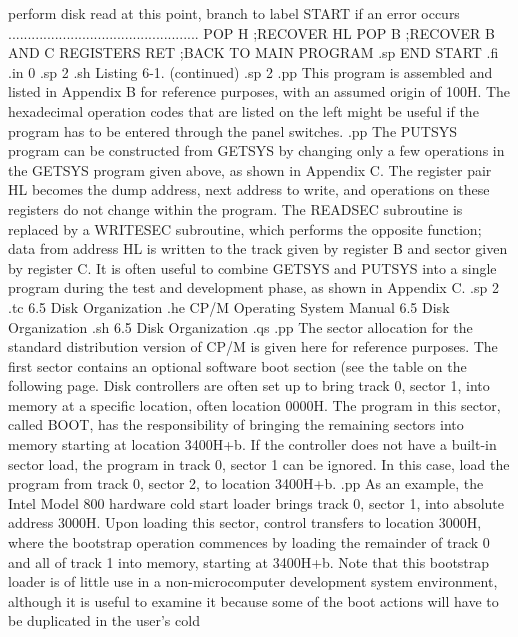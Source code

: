           perform disk read at this point, branch to
          label START if an error occurs
          .................................................
          POP H           ;RECOVER HL
          POP B           ;RECOVER B AND C REGISTERS
          RET             ;BACK TO MAIN PROGRAM
.sp 
          END START
.fi
.in 0
.sp 2
.sh
                    Listing 6-1.  (continued)
.sp 2
.pp
This program is assembled and listed in Appendix B for reference 
purposes, with an assumed origin of 100H.  The hexadecimal 
operation codes that are listed on the left might be useful if the 
program has to be entered through the panel switches.
.pp
The PUTSYS program can be constructed from GETSYS by changing 
only a few operations in the GETSYS program given above, as shown 
in Appendix C.  The register pair HL becomes the dump address, 
next address to write, and operations on these registers do not 
change within the program.  The READSEC subroutine is replaced by 
a WRITESEC subroutine, which performs the opposite function; data 
from address HL is written to the track given by register B 
and sector given by register C.  It is often useful to combine 
GETSYS and PUTSYS into a single program during the test and 
development phase, as shown in Appendix C.
.sp 2
.tc    6.5  Disk Organization
.he CP/M Operating System Manual               6.5  Disk Organization      
.sh
6.5  Disk Organization
.qs
.pp
The sector allocation for the standard distribution version of 
CP/M is given here for reference purposes.  The first sector contains 
an optional software boot section (see the table on the following 
page.   Disk controllers are often set up to bring track 0, 
sector 1, into memory at a specific location, often location 
0000H.  The program in this sector, called BOOT, has the 
responsibility of bringing the remaining sectors into memory 
starting at location 3400H+b.  If the controller does not 
have a built-in sector load, the program in track 0, sector 1 can 
be ignored.  In this case, load the program from track 0, sector 
2, to location 3400H+b.
.pp
As an example, the Intel Model 800 
hardware cold start loader brings track 0, sector 1, into 
absolute address 3000H.  Upon loading this sector, control 
transfers to location 3000H, where the bootstrap operation 
commences by loading the remainder of track 0 and all of track 1 
into memory, starting at 3400H+b.  Note that this bootstrap 
loader is of little use in a non-microcomputer development system 
environment, although it is useful to examine it because some of 
the boot actions will have to be duplicated in the user's cold 
